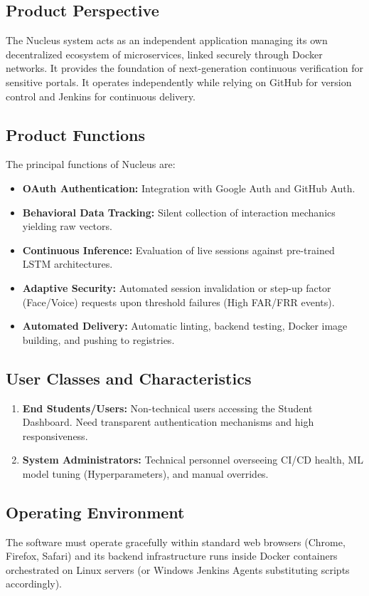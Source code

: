 \documentclass[12pt, a4paper]{article}
\begin{document}
\subsection{Product Perspective}
The Nucleus system acts as an independent application managing its own decentralized ecosystem of microservices, linked securely through Docker networks. It provides the foundation of next-generation continuous verification for sensitive portals. It operates independently while relying on GitHub for version control and Jenkins for continuous delivery.

\subsection{Product Functions}
The principal functions of Nucleus are:
\begin{itemize}
    \item \textbf{OAuth Authentication:} Integration with Google Auth and GitHub Auth.
    \item \textbf{Behavioral Data Tracking:} Silent collection of interaction mechanics yielding raw vectors.
    \item \textbf{Continuous Inference:} Evaluation of live sessions against pre-trained LSTM architectures.
    \item \textbf{Adaptive Security:} Automated session invalidation or step-up factor (Face/Voice) requests upon threshold failures (High FAR/FRR events).
    \item \textbf{Automated Delivery:} Automatic linting, backend testing, Docker image building, and pushing to registries.
\end{itemize}

\subsection{User Classes and Characteristics}
\begin{enumerate}
    \item \textbf{End Students/Users:} Non-technical users accessing the Student Dashboard. Need transparent authentication mechanisms and high responsiveness.
    \item \textbf{System Administrators:} Technical personnel overseeing CI/CD health, ML model tuning (Hyperparameters), and manual overrides.
\end{enumerate}

\subsection{Operating Environment}
The software must operate gracefully within standard web browsers (Chrome, Firefox, Safari) and its backend infrastructure runs inside Docker containers orchestrated on Linux servers (or Windows Jenkins Agents substituting scripts accordingly).
\end{document}
